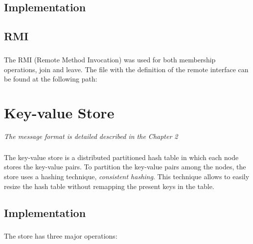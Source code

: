 \documentclass{report}
\begin{document}
			\section{Implementation}
	
				\paragraph{}
				
				\paragraph{}

			\section{RMI}
				\paragraph{} The RMI (Remote Method Invocation) was used for both
				membership operations, join and leave. The file with the definition 
				of the remote interface can be found at the following path:

				\begin{center}
				\end{center}
				
	\chapter{Key-value Store}
			\emph{The message format is detailed described in the Chapter 2}
	
	        \paragraph{} The key-value store is a distributed partitioned hash 
			table in which each node stores the key-value pairs.
			To partition the key-value pairs among the nodes, the store uses a hashing
			technique, \emph{consistent hashing}. This technique allows to easily resize the
			hash table without remapping the present keys in the table.
	        
			\section{Implementation}

				\paragraph{} The store has three major operations:
				
\end{document}
